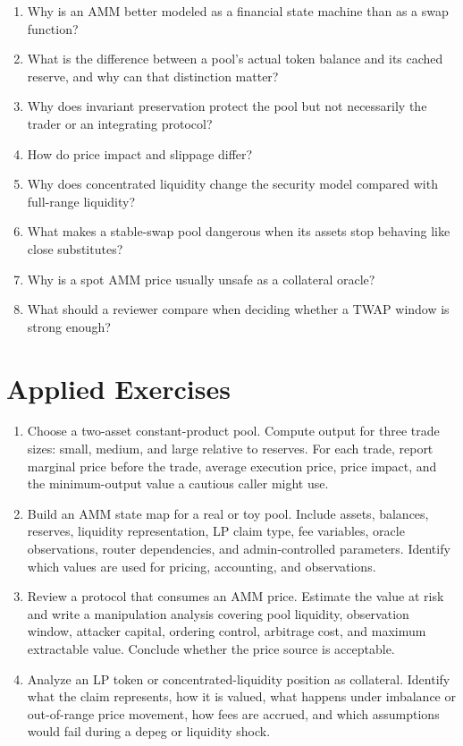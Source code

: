 \begin{enumerate}
\item Why is an AMM better modeled as a financial state machine than as a swap function?
\item What is the difference between a pool's actual token balance and its cached reserve, and why can that distinction matter?
\item Why does invariant preservation protect the pool but not necessarily the trader or an integrating protocol?
\item How do price impact and slippage differ?
\item Why does concentrated liquidity change the security model compared with full-range liquidity?
\item What makes a stable-swap pool dangerous when its assets stop behaving like close substitutes?
\item Why is a spot AMM price usually unsafe as a collateral oracle?
\item What should a reviewer compare when deciding whether a TWAP window is strong enough?
\end{enumerate}

\section*{Applied Exercises}

\begin{enumerate}
\item Choose a two-asset constant-product pool. Compute output for three trade sizes: small, medium, and large relative to reserves. For each trade, report marginal price before the trade, average execution price, price impact, and the minimum-output value a cautious caller might use.

\item Build an AMM state map for a real or toy pool. Include assets, balances, reserves, liquidity representation, LP claim type, fee variables, oracle observations, router dependencies, and admin-controlled parameters. Identify which values are used for pricing, accounting, and observations.

\item Review a protocol that consumes an AMM price. Estimate the value at risk and write a manipulation analysis covering pool liquidity, observation window, attacker capital, ordering control, arbitrage cost, and maximum extractable value. Conclude whether the price source is acceptable.

\item Analyze an LP token or concentrated-liquidity position as collateral. Identify what the claim represents, how it is valued, what happens under imbalance or out-of-range price movement, how fees are accrued, and which assumptions would fail during a depeg or liquidity shock.
\end{enumerate}
